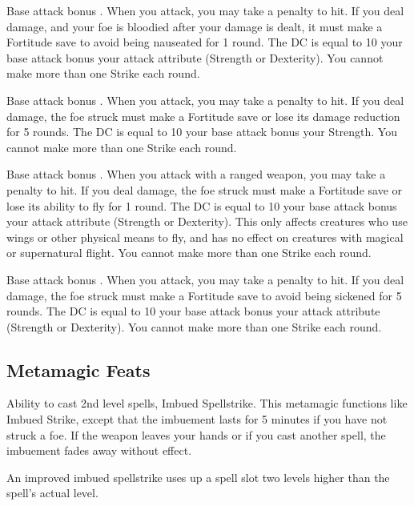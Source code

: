 \featpre Base attack bonus .
\featben When you attack, you may take a  penalty to hit. If you deal damage, and your foe is bloodied after your damage is dealt, it must make a Fortitude save to avoid being nauseated for 1 round. The DC is equal to 10 \add your base attack bonus \add your attack attribute (Strength or Dexterity). You cannot make more than one Strike each round.

\featpre Base attack bonus .
\featben When you attack, you may take a  penalty to hit. If you deal damage, the foe struck must make a Fortitude save or lose its damage reduction for 5 rounds. The DC is equal to 10 \add your base attack bonus \add your Strength. You cannot make more than one Strike each round.

\featpre Base attack bonus .
\featben When you attack with a ranged weapon, you may take a  penalty to hit. If you deal damage, the foe struck must make a Fortitude save or lose its ability to fly for 1 round. The DC is equal to 10 \add your base attack bonus \add your attack attribute (Strength or Dexterity). This only affects creatures who use wings or other physical means to fly, and has no effect on creatures with magical or supernatural flight. You cannot make more than one Strike each round.

\featpre Base attack bonus .
\featben When you attack, you may take a  penalty to hit. If you deal damage, the foe struck must make a Fortitude save to avoid being sickened for 5 rounds. The DC is equal to 10 \add your base attack bonus \add your attack attribute (Strength or Dexterity). You cannot make more than one Strike each round.

\subsection{Metamagic Feats}

 Ability to cast 2nd level spells, Imbued Spellstrike.
 This metamagic functions like Imbued Strike, except that the imbuement lasts for 5 minutes if you have not struck a foe. If the weapon leaves your hands or if you cast another spell, the imbuement fades away without effect.

An improved imbued spellstrike uses up a spell slot two levels higher than the spell's actual level.

